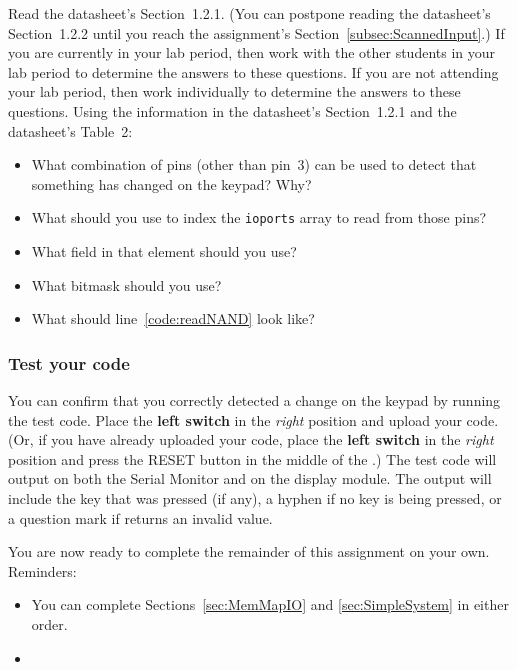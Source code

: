 Read the datasheet's Section~1.2.1.
(You can postpone reading the datasheet's Section~1.2.2 until you reach the assignment's Section~\ref{subsec:ScannedInput}.)
If you are currently in your lab period, then work with the other students in your lab period to determine the answers to these questions.
If you are not attending your lab period, then work individually to determine the answers to these questions.
Using the information in the datasheet's Section~1.2.1 and the datasheet's Table~2:
\begin{itemize}
    \item What combination of pins (other than pin~3) can be used to detect that something has changed on the keypad?
        Why?
    \item What should you use to index the \lstinline{ioports} array to read from those pins?
    \item What field in that element should you use?
    \item What bitmask should you use?
    \item What should line~\ref{code:readNAND} look like?
\end{itemize}

\subsubsection*{Test your code}

You can confirm that you correctly detected a change on the keypad by running the test code.
Place the \textbf{left switch} in the \textit{right} position and upload your code.
(Or, if you have already uploaded your code, place the \textbf{left switch} in the \textit{right} position and press the RESET button in the middle of the \developmentboard.)
The test code will output on both the Serial Monitor and on the display module.
The output will include the key that was pressed (if any), a hyphen if no key is being pressed, or a question mark if  returns an invalid value.


\vspace{1cm}

You are now ready to complete the remainder of this assignment on your own.
Reminders:
\begin{itemize}
    \item You can complete Sections~\ref{sec:MemMapIO} and \ref{sec:SimpleSystem} in either order.
    \item \collaborationrules
\end{itemize}
